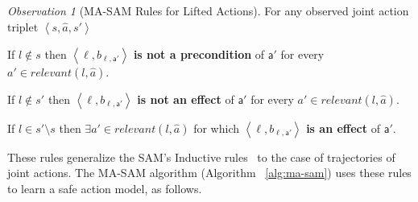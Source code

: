\documentclass[letterpaper]{article} %
\theoremstyle{definition}
\theoremstyle{remark}
\newtheorem{observation}{Observation}
\newcommand{\tuple}[1]{\ensuremath{\left \langle #1 \right \rangle }}
\newcommand{\relevant}{\textit{relevant}}
\newcommand{\liftl}{\ensuremath{\ell}}
\newcommand{\liftatag}{\mathsf{a}'}
\newcommand{\sam}{\ac{SAM}\xspace}
\newcommand{\masam}{\ac{MA-SAM}\xspace}
\begin{document}
\begin{observation}[MA-SAM Rules for Lifted Actions]\label{def:lifted-ma-sam}
For any observed joint action triplet $\tuple{s,\hat{a},s'}$
\begin{compactenum}
    \item If $l\notin s$ then $\tuple{\liftl,b_{\liftl,\liftatag}}$ \textbf{is not a precondition} of $\liftatag$ for every $a'\in \relevant(l,\hat{a})$.

    \item If $l\notin s'$ then $\tuple{\liftl,b_{\liftl,\liftatag}}$ \textbf{is not an effect} of $\liftatag$ for every $a'\in \relevant(l,\hat{a})$.

    \item If $l\in s'\setminus s$ then $\exists a'\in \relevant(l,\hat{a})$ for which
    $\tuple{\liftl,b_{\liftl,\liftatag}}$ \textbf{is an effect} of $\liftatag$.
\end{compactenum}
\end{observation}
\noindent These rules generalize the \sam's Inductive rules~\cite{juba2021safe} to the case of trajectories of joint actions. The \masam algorithm (Algorithm~
\ref{alg:ma-sam}) uses these rules to learn a safe action model, as follows.
\end{document}
